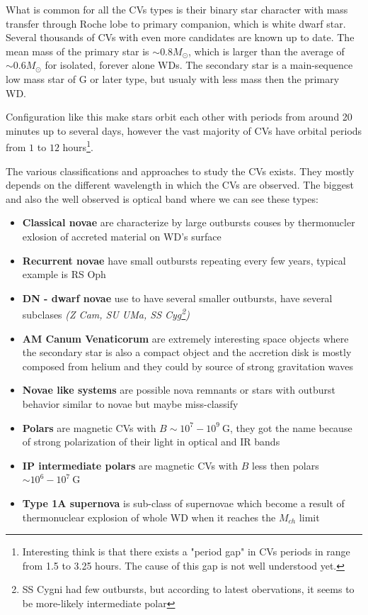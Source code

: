 \documentclass[oneside,a4paper,11pt]{report}
\begin{document}
What is common for all the CVs types is their binary star character with mass transfer through Roche lobe to primary 
companion, which is white dwarf star. Several thousands of CVs with even more candidates are known up to date. 
The mean mass of the primary star is $\sim 0.8 M_\odot$, which is larger than the average of $\sim 0.6 M_\odot$ for isolated, 
forever alone WDs.
The secondary star is a main-sequence low mass star of G or later type, but usualy with less mass then the primary WD.      

Configuration like this make stars orbit each other with periods from around 20 minutes up to several days, 
however the vast majority of CVs have orbital periods from $1$ to $12$ hours\footnote{Interesting think is that there exists a "period gap" 
in CVs periods in range from 1.5 to 3.25 hours. The cause of this gap is not well understood yet. }.

The various classifications and approaches to study the CVs exists. They mostly depends on the different wavelength in which the CVs are 
observed. The biggest and also the well observed is optical band where we can see these types: 
\begin{itemize}
 \item \textbf{Classical novae} are characterize by large outbursts couses by thermonucler exlosion of accreted material on WD's surface
 \item \textbf{Recurrent novae} have small outbursts repeating every few years, typical example is RS Oph
 \item \textbf{DN - dwarf novae} use to have several smaller outbursts, have several subclases \textit{(Z Cam, SU UMa, SS Cyg\footnote{SS Cygni had few 
outbursts, but according to latest obervations, it seems to be more-likely intermediate polar})} 
 \item \textbf{AM Canum Venaticorum} are extremely interesting space objects where the secondary star is also a compact object and the accretion 
disk is mostly composed from helium and they could by source of strong gravitation waves 
 \item \textbf{Novae like systems} are possible nova remnants or stars with outburst behavior similar to novae but maybe miss-classify
 \item \textbf{Polars} are magnetic CVs with $B \sim 10^7 - 10^9 \:\mathrm{G}$, they got the name because of strong polarization of their light in optical and IR bands 
 \item \textbf{IP intermediate polars} are magnetic CVs with $B$ less then polars $\sim10^6-10^7\: \mathrm{G}$ 
 \item \textbf{Type 1A supernova} is sub-class of supernovae which become a result of thermonuclear explosion of whole WD when it reaches the $M_{ch}$ limit  
\end{itemize}
\end{document}
